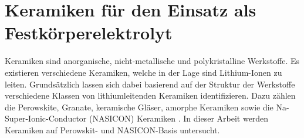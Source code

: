 \documentclass[a4paper, 11pt, headsepline,footsepline,twoside,abstract]{scrbook}
\begin{document}
\section{Keramiken für den Einsatz als Festkörperelektrolyt}
\label{grundlagen_keramik}
Keramiken sind anorganische, nicht-metallische und polykristalline Werkstoffe. Es existieren verschiedene Keramiken, welche in der Lage sind Lithium-Ionen zu leiten. Grundsätzlich lassen sich dabei basierend auf der Struktur der Werkstoffe verschiedene Klassen von lithiumleitenden Keramiken identifizieren. Dazu zählen die Perowskite, Granate, keramische Gläser, amorphe Keramiken sowie die Na-Super-Ionic-Conductor (NASICON) Keramiken \cite{tatsumisago2013recent}. In dieser Arbeit werden Keramiken auf Perowskit- und NASICON-Basis untersucht.
\end{document}
